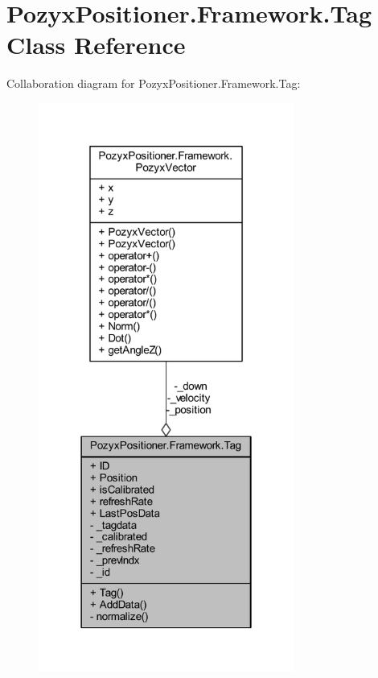 \hypertarget{class_pozyx_positioner_1_1_framework_1_1_tag}{}\section{Pozyx\+Positioner.\+Framework.\+Tag Class Reference}
\label{class_pozyx_positioner_1_1_framework_1_1_tag}


Collaboration diagram for Pozyx\+Positioner.\+Framework.\+Tag\+:
\nopagebreak
\begin{figure}[H]
\begin{center}
\leavevmode
\includegraphics[width=238pt]{class_pozyx_positioner_1_1_framework_1_1_tag__coll__graph}
\end{center}
\end{figure}
